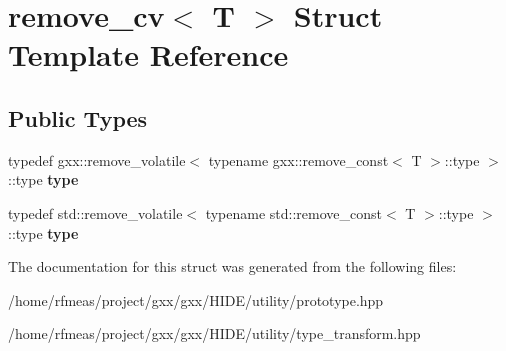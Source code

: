 \hypertarget{structremove__cv}{}\section{remove\+\_\+cv$<$ T $>$ Struct Template Reference}
\label{structremove__cv}
\subsection*{Public Types}
\begin{DoxyCompactItemize}
\item 
typedef gxx\+::remove\+\_\+volatile$<$ typename gxx\+::remove\+\_\+const$<$ T $>$\+::type $>$\+::type {\bfseries type}\hypertarget{structremove__cv_ad415a5e6e1bc1c13ce9e0fa3583212a8}{}\label{structremove__cv_ad415a5e6e1bc1c13ce9e0fa3583212a8}

\item 
typedef std\+::remove\+\_\+volatile$<$ typename std\+::remove\+\_\+const$<$ T $>$\+::type $>$\+::type {\bfseries type}\hypertarget{structremove__cv_aa0ae042970ffbae927d3bbf6ab7eef28}{}\label{structremove__cv_aa0ae042970ffbae927d3bbf6ab7eef28}

\end{DoxyCompactItemize}


The documentation for this struct was generated from the following files\+:\begin{DoxyCompactItemize}
\item 
/home/rfmeas/project/gxx/gxx/\+H\+I\+D\+E/utility/prototype.\+hpp\item 
/home/rfmeas/project/gxx/gxx/\+H\+I\+D\+E/utility/type\+\_\+transform.\+hpp\end{DoxyCompactItemize}
